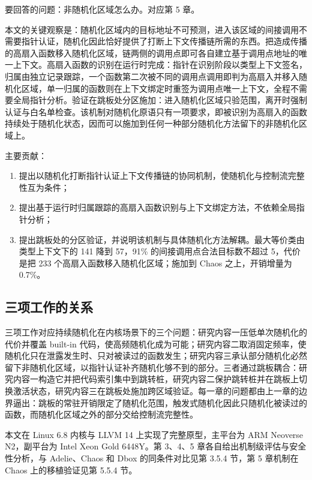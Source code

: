 要回答的问题：非随机化区域怎么办。对应第 5 章。

本文的关键观察是：随机化区域内的目标地址不可预测，进入该区域的间接调用不需要指针认证，随机化因此恰好提供了打断上下文传播链所需的东西。把造成传播的高扇入函数移入随机化区域，链两侧的调用点即可各自建立基于调用点地址的唯一上下文。高扇入函数的识别在运行时完成：指针在识别阶段以类型上下文签名，归属由独立记录跟踪，一个函数第二次被不同的调用点调用即判为高扇入并移入随机化区域，单一归属的函数则在上下文绑定时重签为调用点唯一上下文，全程不需要全局指针分析。验证在跳板处分区施加：进入随机化区域只验范围，离开时强制认证与白名单检查。该机制对随机化原语只有一项要求，即被识别为高扇入的函数持续处于随机化状态，因而可以施加到任何一种部分随机化方法留下的非随机化区域上。

主要贡献：

\begin{enumerate}
    \item 提出以随机化打断指针认证上下文传播链的协同机制，使随机化与控制流完整性互为条件；
    \item 提出基于运行时归属跟踪的高扇入函数识别与上下文绑定方法，不依赖全局指针分析；
    \item 提出跳板处的分区验证，并说明该机制与具体随机化方法解耦。最大等价类由类型上下文下的 141 降到 57，91\% 的间接调用点合法目标数不超过 5，代价是把 233 个高扇入函数移入随机化区域；施加到 Chaos 之上，开销增量为 0.7\%。
\end{enumerate}

\subsection{三项工作的关系}

三项工作对应持续随机化在内核场景下的三个问题：研究内容一压低单次随机化的代价并覆盖 built-in 代码，使高频随机化成为可能；研究内容二取消固定频率，使随机化只在泄露发生时、只对被读过的函数发生；研究内容三承认部分随机化必然留下非随机化区域，以指针认证补齐随机化够不到的部分。三者通过跳板耦合：研究内容一构造它并把代码索引集中到跳转桩，研究内容二保护跳转桩并在跳板上切换激活状态，研究内容三在跳板处施加跨区域验证。每一章的问题都由上一章的边界逼出：跳板的常驻开销限定了随机化范围，触发式随机化因此只随机化被读过的函数，而随机化区域之外的部分交给控制流完整性。

本文在 Linux 6.8 内核与 LLVM 14 上实现了完整原型，主平台为 ARM Neoverse N2，副平台为 Intel Xeon Gold 6448Y。第 3、4、5 章各自给出机制级评估与安全性分析，与 Adelie、Chaos 和 Dbox 的同条件对比见第 3.5.4 节，第 5 章机制在 Chaos 上的移植验证见第 5.5.4 节。

